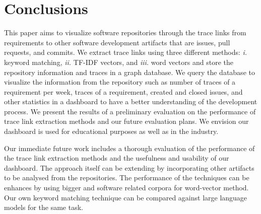 \section{Conclusions}
\label{sec:conc}

This paper aims to visualize software repositories through the trace links from requirements to other software development artifacts that are issues, pull requests, and commits. We extract trace links using three different methods: \emph{i.} keyword matching, \emph{ii.} TF-IDF vectors, and \emph{iii.} word vectors and store the repository information and traces in a graph database. We query the database to visualize the information from the repository such as number of traces of a requirement per week, traces of a requirement, created and closed issues, and other statistics in a dashboard to have a better understanding of the development process. We present the results of a preliminary evaluation on the performance of trace link extraction methods and our future evaluation plans. We envision our dashboard is used for educational purposes as well as in the industry.

Our immediate future work includes a thorough evaluation of the performance of the trace link extraction methods and the usefulness and usability of our dashboard. The approach itself can be extending by incorporating other artifacts to be analysed from the repositories. The performance of the techniques can be enhances by using bigger and software related corpora for word-vector method. Our own keyword matching technique can be compared against large language models for the same task.




